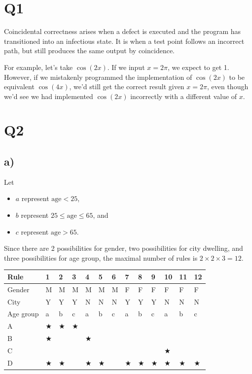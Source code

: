 \documentclass[12pt, letterpaper, titlepage]{article}
\begin{document}
 
\onehalfspacing

\section*{Q1}
Coincidental correctness arises when a defect is executed and the program has transitioned into an infectious state. It is when a test point follows an incorrect path, but still produces the same output by coincidence. 

For example, let's take $\cos(2x)$. If we input $x = 2\pi$, we expect to get 1. However, if we mistakenly programmed the implementation of $\cos(2x)$ to be equivalent $\cos(4x)$, we'd still get the correct result given $x = 2\pi$, even though we'd see we had implemented $\cos(2x)$ incorrectly with a different value of $x$.

\section*{Q2}
\subsection*{a)}
Let
\begin{itemize}
    \item $a$ represent $\text{age}<25$,
    \item $b$ represent $25\leq\text{age}\leq65$, and
    \item $c$ represent $\text{age}>65$.
\end{itemize}
Since there are 2 possibilities for gender, two possibilities for city dwelling, and three possibilities for age group, the maximal number of rules is $2\times2\times3=12$.

\begin{centering}
\begin{tabularx}{\textwidth}{|X|s|s|s|s|s|s|s|s|s|s|s|s|}
    \hline
    \textbf{Rule} & \textbf{1} & \textbf{2} & \textbf{3} & \textbf{4} & \textbf{5} & \textbf{6} & \textbf{7} & \textbf{8} & \textbf{9} & \textbf{10} & \textbf{11} & \textbf{12} \\
    \hline
    Gender & M & M & M & M & M & M & F & F & F & F & F & F \\
    \hline
    City & Y & Y & Y & N & N & N & Y & Y & Y & N & N & N \\
    \hline
    Age group & a&b&c&a&b&c&a&b&c&a&b&c \\
    \hline
    A &$\bigstar$&$\bigstar$&$\bigstar$ &&& &&& &&& \\
    \hline
    B &$\bigstar$&& &$\bigstar$&& &&& &&& \\
    \hline
    C &&& &&& &&& &$\bigstar$&& \\
    \hline
    D &$\bigstar$&$\bigstar$& &$\bigstar$&$\bigstar$& &$\bigstar$&$\bigstar$&$\bigstar$ &$\bigstar$&$\bigstar$&$\bigstar$ \\
    \hline
\end{tabularx}
\end{centering}
\end{document}
